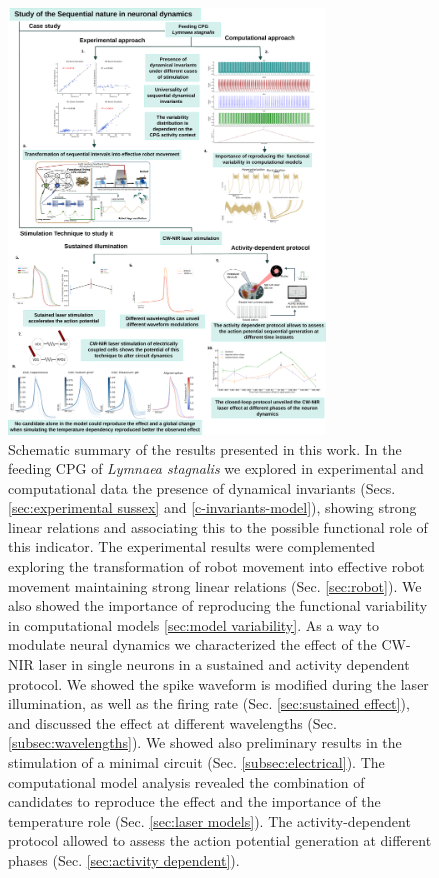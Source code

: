 \begin{figure}[htb!]
	\centering
	\includegraphics[width=0.75\textwidth]{img/panel_discussion_vertical_figures.pdf}
	\caption{Schematic summary of the results presented in this work. In the feeding CPG of \textit{Lymnaea stagnalis} we explored in experimental and computational data the presence of dynamical invariants (Secs. \ref{sec:experimental sussex} and \ref{c-invariants-model}), showing strong linear relations and associating this to the possible functional role of this indicator. The experimental results were complemented exploring the transformation of robot movement into effective robot movement maintaining strong linear relations (Sec. \ref{sec:robot}). We also showed the importance of reproducing the functional variability in computational models \ref{sec:model variability}. As a way to modulate neural dynamics we characterized the effect of the CW-NIR laser in single neurons in a sustained and activity dependent protocol. We showed the spike waveform is modified during the laser illumination, as well as the firing rate (Sec. \ref{sec:sustained effect}), and discussed the effect at different wavelengths (Sec. \ref{subsec:wavelengths}). We showed also preliminary results in the stimulation of a minimal circuit (Sec. \ref{subsec:electrical}). The computational model analysis revealed the combination of candidates to reproduce the effect and the importance of the temperature role (Sec. \ref{sec:laser models}). The activity-dependent protocol allowed to assess the action potential generation at different phases (Sec. \ref{sec:activity dependent}).}
	\label{fig:summary conlusions}
\end{figure}


